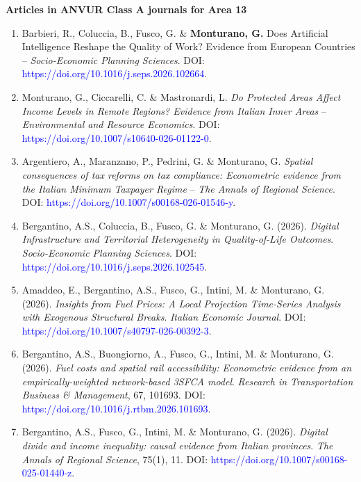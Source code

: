 \documentclass[11pt,a4paper,sans]{moderncv} %
\begin{document}
\textbf{Articles in ANVUR Class A journals for Area 13}
\begin{enumerate}[label=\arabic*.]


\item Barbieri, R., Coluccia, B., Fusco, G. \& \textbf{Monturano, G.}
Does Artificial Intelligence Reshape the Quality of Work? Evidence from European Countries
-- \textit{Socio-Economic Planning Sciences}. DOI: \textcolor{blue}{https://doi.org/10.1016/j.seps.2026.102664}.


\item Monturano, G., Ciccarelli, C. \& Mastronardi, L. \textit{Do Protected Areas Affect Income Levels in Remote Regions? Evidence from Italian Inner Areas} -- \textit{Environmental and Resource Economics}. DOI: \textcolor{blue}{https://doi.org/10.1007/s10640-026-01122-0}.

\item Argentiero, A., Maranzano, P., Pedrini, G. \& Monturano, G. \textit{Spatial consequences of tax reforms on tax compliance: Econometric evidence from the Italian Minimum Taxpayer Regime} -- \textit{The Annals of Regional Science}. DOI: \textcolor{blue}{https://doi.org/10.1007/s00168-026-01546-y}.


\item Bergantino, A.S., Coluccia, B., Fusco, G. \& Monturano, G. (2026). \textit{Digital Infrastructure and Territorial Heterogeneity in Quality-of-Life Outcomes}. \textit{Socio-Economic Planning Sciences}. DOI: \textcolor{blue}{https://doi.org/10.1016/j.seps.2026.102545}.

\item Amaddeo, E., Bergantino, A.S., Fusco, G., Intini, M. \& Monturano, G. (2026). \textit{Insights from Fuel Prices: A Local Projection Time-Series Analysis with Exogenous Structural Breaks}. \textit{Italian Economic Journal}. DOI: \textcolor{blue}{https://doi.org/10.1007/s40797-026-00392-3}.

\item Bergantino, A.S., Buongiorno, A., Fusco, G., Intini, M. \& Monturano, G. (2026). \textit{Fuel costs and spatial rail accessibility: Econometric evidence from an empirically-weighted network-based 3SFCA model}. \textit{Research in Transportation Business \& Management}, 67, 101693. DOI: \textcolor{blue}{https://doi.org/10.1016/j.rtbm.2026.101693}.

\item Bergantino, A.S., Fusco, G., Intini, M. \& Monturano, G. (2026). \textit{Digital divide and income inequality: causal evidence from Italian provinces}. \textit{The Annals of Regional Science}, 75(1), 11. DOI: \textcolor{blue}{https://doi.org/10.1007/s00168-025-01440-z}.


\end{enumerate}
\end{document}

